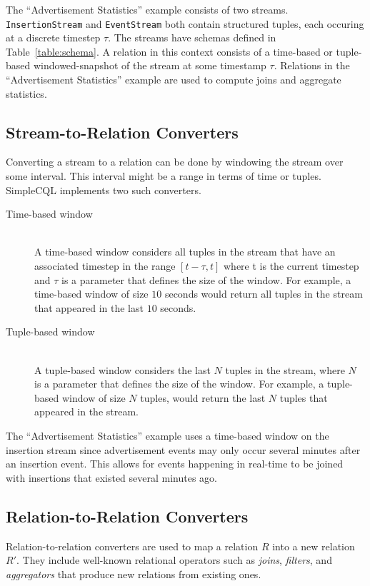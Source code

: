 \documentclass[a4paper, 10pt, conference]{IEEEconf}
\begin{document}
The ``Advertisement Statistics'' example consists of two streams.  \texttt{InsertionStream} and \texttt{EventStream} both contain structured tuples, each occuring at a discrete timestep $\tau$. The streams have schemas defined in Table~\ref{table:schema}.  A relation in this context consists of a time-based or tuple-based windowed-snapshot of the stream at some timestamp $\tau$.  Relations in the ``Advertisement Statistics'' example are used to compute joins and aggregate statistics.

\subsection{Stream-to-Relation Converters}
Converting a stream to a relation can be done by windowing the stream over some interval.  This interval might be a range in terms of time or tuples.  SimpleCQL implements two such converters.

\begin{description}
  \item[Time-based window] \hfill \\
  A time-based window considers all tuples in the stream that have an associated timestep in the range $[t-\tau, t]$ where t is the current timestep and $\tau$ is a parameter that defines the size of the window. For example, a time-based window of size $10$ seconds would return all tuples in the stream that appeared in the last $10$ seconds.
  
  \item[Tuple-based window] \hfill \\
  A tuple-based window considers the last $N$ tuples in the stream, where $N$ is a parameter that defines the size of the window. For example, a tuple-based window of size $N$ tuples, would return the last $N$ tuples that appeared in the stream.
\end{description}

The ``Advertisement Statistics'' example uses a time-based window on the insertion stream since advertisement events may only occur several minutes after an insertion event.  This allows for events happening in real-time to be joined with insertions that existed several minutes ago.

\subsection{Relation-to-Relation Converters}

Relation-to-relation converters are used to map a relation $R$ into a new relation $R'$.  They include well-known relational operators such as \textit{joins}, \textit{filters}, and \textit{aggregators} that produce new relations from existing ones. 
\end{document}
